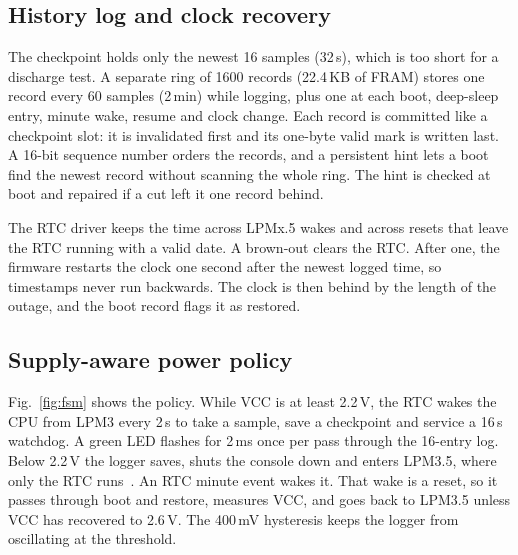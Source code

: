 \documentclass[11pt,a4paper]{article}
\begin{document}
\subsection{History log and clock recovery}
\label{sec:hist}

The checkpoint holds only the newest 16 samples (32\,s), which is too short for a discharge test. A separate ring of 1600 records (22.4\,KB of FRAM) stores one record every 60 samples (2\,min) while logging, plus one at each boot, deep-sleep entry, minute wake, resume and clock change. Each record is committed like a checkpoint slot: it is invalidated first and its one-byte valid mark is written last. A 16-bit sequence number orders the records, and a persistent hint lets a boot find the newest record without scanning the whole ring. The hint is checked at boot and repaired if a cut left it one record behind.

The RTC driver keeps the time across LPMx.5 wakes and across resets that leave the RTC running with a valid date. A brown-out clears the RTC. After one, the firmware restarts the clock one second after the newest logged time, so timestamps never run backwards. The clock is then behind by the length of the outage, and the boot record flags it as restored.

\subsection{Supply-aware power policy}

Fig.~\ref{fig:fsm} shows the policy. While VCC is at least 2.2\,V, the RTC wakes the CPU from LPM3 every 2\,s to take a sample, save a checkpoint and service a 16\,s watchdog. A green LED flashes for 2\,ms once per pass through the 16-entry log. Below 2.2\,V the logger saves, shuts the console down and enters LPM3.5, where only the RTC runs~\cite{ti_slau367}. An RTC minute event wakes it. That wake is a reset, so it passes through boot and restore, measures VCC, and goes back to LPM3.5 unless VCC has recovered to 2.6\,V. The 400\,mV hysteresis keeps the logger from oscillating at the threshold.
\end{document}
